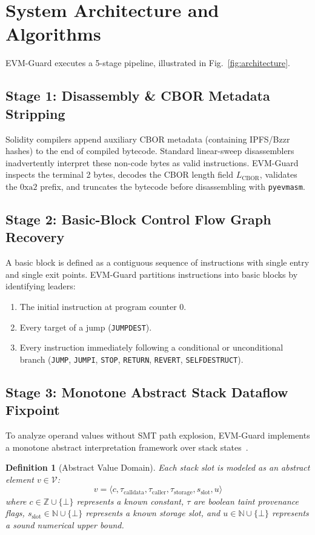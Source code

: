 \documentclass[conference]{IEEEtran}
\newtheorem{defn}{Definition}
\newenvironment{definition}[1][]{\begin{defn}[#1]\upshape}{\end{defn}}
\begin{document}
\section{System Architecture and Algorithms}\label{sec:architecture}

EVM-Guard executes a 5-stage pipeline, illustrated in Fig.~\ref{fig:architecture}.

\subsection{Stage 1: Disassembly \& CBOR Metadata Stripping}
Solidity compilers append auxiliary CBOR metadata (containing IPFS/Bzzr hashes) to the end of compiled bytecode. Standard linear-sweep disassemblers inadvertently interpret these non-code bytes as valid instructions. EVM-Guard inspects the terminal 2 bytes, decodes the CBOR length field $L_{\mathrm{CBOR}}$, validates the $0\mathrm{xa2}$ prefix, and truncates the bytecode before disassembling with \texttt{pyevmasm}.

\subsection{Stage 2: Basic-Block Control Flow Graph Recovery}
A basic block is defined as a contiguous sequence of instructions with single entry and single exit points. EVM-Guard partitions instructions into basic blocks by identifying leaders:
\begin{enumerate}
    \item The initial instruction at program counter 0.
    \item Every target of a jump (\texttt{JUMPDEST}).
    \item Every instruction immediately following a conditional or unconditional branch (\texttt{JUMP}, \texttt{JUMPI}, \texttt{STOP}, \texttt{RETURN}, \texttt{REVERT}, \texttt{SELFDESTRUCT}).
\end{enumerate}

\subsection{Stage 3: Monotone Abstract Stack Dataflow Fixpoint}
To analyze operand values without SMT path explosion, EVM-Guard implements a monotone abstract interpretation framework over stack states~\cite{cousot1977abstract}.

\begin{definition}[Abstract Value Domain]
Each stack slot is modeled as an abstract element $v \in \mathcal{V}$:
\begin{equation}
v = \langle c, \tau_{\mathrm{calldata}}, \tau_{\mathrm{caller}}, \tau_{\mathrm{storage}}, s_{\mathrm{slot}}, u \rangle
\end{equation}
where $c \in \mathbb{Z} \cup \{\bot\}$ represents a known constant, $\tau$ are boolean taint provenance flags, $s_{\mathrm{slot}} \in \mathbb{N} \cup \{\bot\}$ represents a known storage slot, and $u \in \mathbb{N} \cup \{\bot\}$ represents a sound numerical upper bound.
\end{definition}
\end{document}
